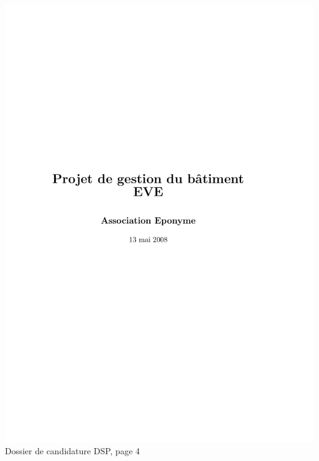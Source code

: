 \includegraphics[scale=0.85,trim=20mm 20mm 20mm 20mm,clip,page=4]{annexes/candidature_dsp.pdf} \\
Dossier de candidature DSP, page 4
\newpage
